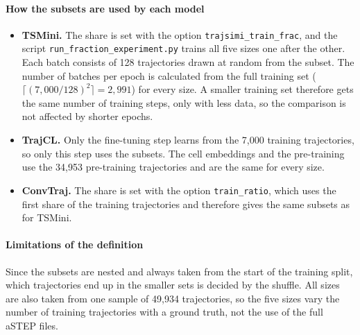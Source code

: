 \paragraph{How the subsets are used by each model}
\begin{itemize}
  \item \textbf{TSMini.} The share is set with the option
        \texttt{trajsimi\_train\_frac}, and the script
        \texttt{run\_fraction\_experiment.py} trains all five sizes one after the
        other. Each batch consists of 128 trajectories drawn at random from the
        subset. The number of batches per epoch is calculated from the full
        training set ($\lceil (7{,}000/128)^2 \rceil = 2{,}991$) for every size. A
        smaller training set therefore gets the same number of training steps, only
        with less data, so the comparison is not affected by shorter epochs.
  \item \textbf{TrajCL.} Only the fine-tuning step learns from the 7{,}000
        training trajectories, so only this step uses the subsets. The cell
        embeddings and the pre-training use the 34{,}953 pre-training trajectories
        and are the same for every size.
  \item \textbf{ConvTraj.} The share is set with the option
        \texttt{train\_ratio}, which uses the first share of the training
        trajectories and therefore gives the same subsets as for TSMini.
\end{itemize}

\paragraph{Limitations of the definition}
Since the subsets are nested and always taken from the start of the training
split, which trajectories end up in the smaller sets is decided by the shuffle. All
sizes are also taken from one sample of 49{,}934 trajectories, so the five sizes
vary the number of training trajectories with a ground truth, not the use of the
full aSTEP files.
